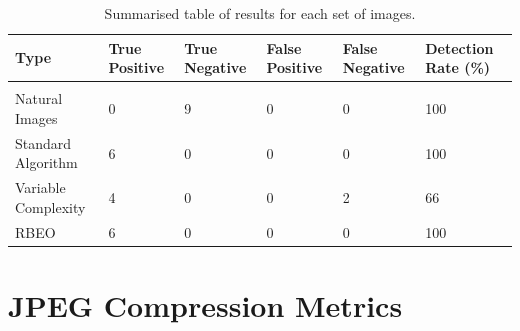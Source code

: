 \documentclass{l4proj}
\begin{document}
\begin{appendices}
\begin{table}[!h]
\centering
\caption{Summarised table of results for each set of images.}
\label{table:detection_results_summarised}
\begin{tabular}{@{}llllll@{}}
\toprule
Type                & True Positive & True Negative & False Positive & False Negative & Detection Rate (\%) \\\midrule  \\
Natural Images      &0              &9              &0               &0               &100                   \\
Standard Algorithm  &6              &0              &0               &0               &100                    \\
Variable Complexity &4              &0              &0               &2               &66                    \\
RBEO                &6              &0              &0               &0               &100\\\bottomrule                 
\end{tabular}
\end{table}

\chapter{JPEG Compression Metrics}


\end{appendices}
\end{document}
